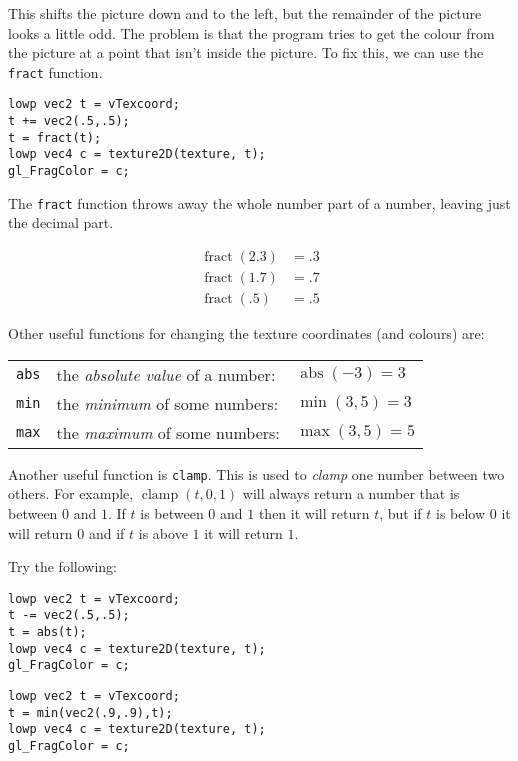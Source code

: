 \documentclass[
  html5,%
  mathml,%
  use filename%
]{internet}
\DeclareMathOperator\fract{fract}
\DeclareMathOperator\clamp{clamp}
\DeclareMathOperator\abs{abs}
\begin{document}
This shifts the picture down and to the left, but the remainder of the picture looks a little odd.
The problem is that the program tries to get the colour from the picture at a point that isn't inside the picture.
To fix this, we can use the \verb!fract! function.

\begin{tcolorbox}
\begin{verbatim}
lowp vec2 t = vTexcoord;
t += vec2(.5,.5);
t = fract(t);
lowp vec4 c = texture2D(texture, t);
gl_FragColor = c;
\end{verbatim}
\end{tcolorbox}

The \verb!fract! function throws away the whole number part of a number, leaving just the decimal part.

\begin{align*}
\fract(2.3) &= .3 \\
\fract(1.7) &= .7 \\
\fract(.5) &= .5
\end{align*}

Other useful functions for changing the texture coordinates (and colours) are:

\begin{tabular}{rll}
\verb!abs! & the \emph{absolute value} of a number: & \(\abs(-3) = 3\) \\
\verb!min! & the \emph{minimum} of some numbers: & \(\min(3,5) = 3\) \\
\verb!max! & the \emph{maximum} of some numbers: & \(\max(3,5) = 5\)
\end{tabular}

Another useful function is \verb!clamp!.
This is used to \emph{clamp} one number between two others.
For example, \(\clamp(t,0,1)\) will always return a number that is between \(0\) and \(1\).
If \(t\) is between \(0\) and \(1\) then it will return \(t\), but if \(t\) is below \(0\) it will return \(0\) and if \(t\) is above \(1\) it will return \(1\).

Try the following:

\begin{tcolorbox}
\begin{verbatim}
lowp vec2 t = vTexcoord;
t -= vec2(.5,.5);
t = abs(t);
lowp vec4 c = texture2D(texture, t);
gl_FragColor = c;
\end{verbatim}
\end{tcolorbox}

\begin{tcolorbox}
\begin{verbatim}
lowp vec2 t = vTexcoord;
t = min(vec2(.9,.9),t);
lowp vec4 c = texture2D(texture, t);
gl_FragColor = c;
\end{verbatim}
\end{tcolorbox}
\end{document}
